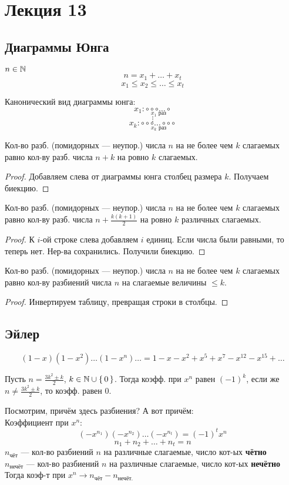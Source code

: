 \section{Лекция 13}
\subsection{Диаграммы Юнга}
$n \in \mathbb{N}$
\[
n = x_1 + \ldots + x_t
\]
\[
x_1 \leq x_2 \leq \ldots \leq x_t
\]
\begin{symb}
Канонический вид диаграммы юнга:
\[
x_1 \colon \underset{x_1 \text{ раз}}{\circ \circ \circ \ldots \circ}
\]
\[
\vdots
\]
\[
x_k \colon \underset{x_k \text{ раз}}{\circ \circ \circ \ldots \circ \circ \circ}
\]
\end{symb}

\begin{theorem}
\label{th:diag_ung_1}
  Кол-во разб. (помидорных --- неупор.) числа $n$ на не более чем $k$ слагаемых равно кол-ву разб. числа $n + k$ на ровно $k$ слагаемых.
\end{theorem}
\begin{proof}
Добавляем слева от диаграммы юнга столбец размера $k$. Получаем биекцию.
\end{proof}
\begin{theorem}
\label{th:diag_ung_2}
  Кол-во разб. (помидорных --- неупор.) числа $n$ на не более чем $k$ слагаемых равно кол-ву разб. числа $n + \frac{k(k + 1)}{2}$ на ровно $k$ различных слагаемых.
\end{theorem}
\begin{proof}
  К $i$-ой строке слева добавляем $i$ единиц. Если числа были равными, то теперь нет. Нер-ва сохранились. Получили биекцию.
\end{proof}
\begin{theorem}
\label{th:diag_ung_3}
Кол-во разб. (помидорных --- неупор.) числа $n$ на не более чем $k$ слагаемых равно кол-ву разбиений числа $n$ на слагаемые величины $\leq k$.
\end{theorem}
\begin{proof}
Инвертируем таблицу, превращая строки в столбцы.
\end{proof}

\subsection{Эйлер}
\[
  (1 - x)(1 - x^{2}) \ldots (1 - x^{n}) \ldots = 1 - x - x^{2} + x^{5} + x^{7} - x^{12} - x^{15} + \ldots
\]
\begin{theorem}
\label{th:euler_1}
Пусть $n = \frac{3k^{2} \pm k}{2}$, $k \in \mathbb{N} \cup \set{0}$. Тогда коэфф. при $x^{n}$ равен $(-1)^{k}$, если же $n \neq \frac{3k^{2} \pm k}{2}$, то коэфф. равен $0$.
\end{theorem}
Посмотрим, причём здесь разбиения? А вот причём: \\
Коэффициент при $x^{n}$:
\[
  (-x^{n_1})(-x^{n_2})\ldots(-x^{n_t}) = (-1)^{t} x^{n}
\]
\[
n_1 + n_2 + \ldots + n_t = n
\]
$n_{\text{чёт}}$ --- кол-во разбиений $n$ на различные слагаемые, число кот-ых \textbf{чётно} \\
$n_{ \text{нечёт}}$ --- кол-во разбиений $n$ на различные слагаемые, число кот-ых \textbf{нечётно} \\
Тогда коэф-т при $x^{n} \rightarrow n_{\text{чёт}} - n_{\text{нечёт.}}$
